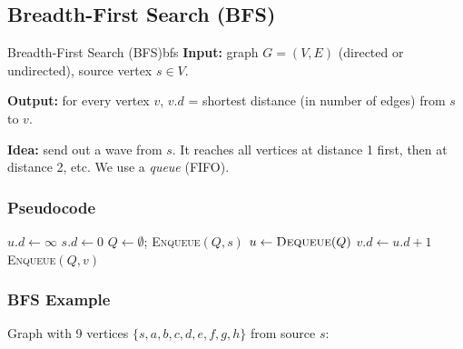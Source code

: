 \subsection{Breadth-First Search (BFS)}

\begin{definition}{Breadth-First Search (BFS)}{bfs}
\textbf{Input:} graph $G = (V,E)$ (directed or undirected), source vertex $s \in V$.

\textbf{Output:} for every vertex $v$, $v.d$ = shortest distance (in number of
edges) from $s$ to $v$.
\end{definition}

\textbf{Idea:} send out a wave from $s$. It reaches all vertices at distance 1 first,
then at distance 2, etc. We use a \emph{queue} (FIFO).

\subsubsection{Pseudocode}

\begin{algorithm}[H]
\caption{BFS($G$, $s$)}
\begin{algorithmic}[1]
    \State $u.d \leftarrow \infty$
\EndFor
\State $s.d \leftarrow 0$
\State $Q \leftarrow \emptyset$;\; \textsc{Enqueue}$(Q, s)$
    \State $u \leftarrow \textsc{Dequeue}(Q)$
                   
            \State $v.d \leftarrow u.d + 1$
            \State \textsc{Enqueue}$(Q, v)$
        \EndIf
    \EndFor
\EndWhile
\end{algorithmic}
\end{algorithm}

\subsubsection{BFS Example}

Graph with 9 vertices $\{s, a, b, c, d, e, f, g, h\}$ from source $s$:

